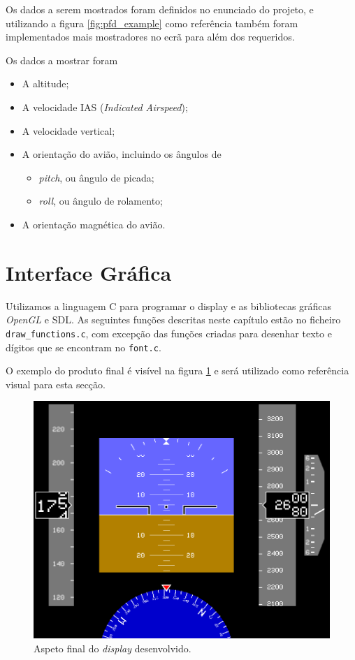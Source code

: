 \documentclass[palatino]{ist-report}
\begin{document}
Os dados a serem mostrados foram definidos no enunciado do projeto, e utilizando a figura \ref{fig:pfd_example} como referência também foram implementados mais mostradores no ecrã para além dos requeridos.

Os dados a mostrar foram
\begin{itemize}
    \item A altitude;
    \item A velocidade IAS (\textit{Indicated Airspeed});
    \item A velocidade vertical;
    \item A orientação do avião, incluindo os ângulos de
    \begin{itemize}
        \item \textit{pitch}, ou ângulo de picada;
        \item \textit{roll}, ou ângulo de rolamento;
    \end{itemize}
    \item A orientação magnética do avião.
\end{itemize}

\section{Interface Gráfica}

Utilizamos a linguagem C para programar o display e as bibliotecas gráficas \textit{OpenGL} e SDL. As seguintes funções descritas neste capítulo estão no ficheiro \texttt{draw\_functions.c}, com excepção das funções criadas para desenhar texto e dígitos que se encontram no \texttt{font.c}.

O exemplo do produto final é visível na figura \ref{fig:display_main} e será utilizado como referência visual para esta secção.
\begin{figure}[ht]
    \centering
    \includegraphics[width = 0.8\linewidth]{PFD_simulado.png}
    \caption{Aspeto final do \textit{display} desenvolvido.}
    \label{fig:display_main}
\end{figure}
\end{document}
